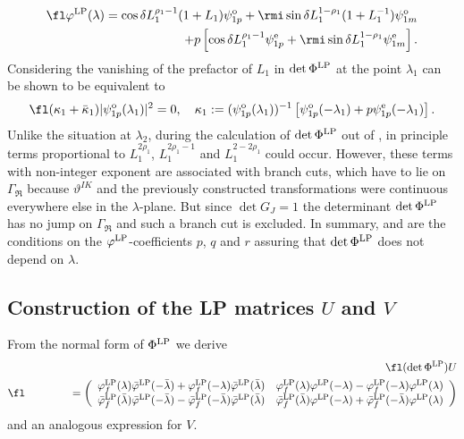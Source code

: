 \documentclass[12pt]{iopart}
\begin{document}
\begin{eqnarray}
\fl \varphi^{\rm LP}(\lambda)=\cos{\delta}L_1^{\rho_1-1}(1+L_1)\psi_{1p}^{\rm o} 
 +\rmi \sin{\delta}L_1^{1-\rho_1}(1+L_1^{-1})\psi_{1m}^{\rm o}\nonumber\\
+p\left[\cos{\delta}L_1^{\rho_1-1}\psi_{1p}^{\rm e}
 +\rmi\sin{\delta}L_1^{1-\rho_1}\psi_{1m}^{\rm e}\right].
 \label{chipsi1}
\end{eqnarray}
Considering  the vanishing of the prefactor of $L_1$ in $\det\Phi^{\rm LP}$ at the point $\lambda_1$ can be shown to be equivalent to
\begin{equation} \label{kappa1}
\fl(\kappa_1+\bar{\kappa}_1)|\psi_{1p}^{\rm o}(\lambda_1)|^2=0, \quad \kappa_1:=(\psi_{1p}^{\rm o}(\lambda_1))^{-1} \left[\psi_{1p}^{\rm o}(-\lambda_1)+p\psi_{1p}^{\rm e}(-\lambda_1)\right].
\end{equation}
Unlike the situation at $\lambda_2$, during the calculation of $\det\Phi^{\rm LP}$ out of , in principle terms proportional to $L_1^{2\rho_1}$, $L_1^{2\rho_1-1}$ and $L_1^{2-2\rho_1}$ could occur. However, these terms with non-integer exponent are  associated with branch cuts, which have to lie on $\Gamma_\Re$ because $\vartheta^{IK}$ and the previously constructed transformations were continuous everywhere else in the $\lambda$-plane. But since $\det G_J=1$ the  determinant $\det\Phi^{\rm LP}$ has no jump on $\Gamma_\Re$ and such a branch cut is excluded. In summary,  and  are the conditions on the $\varphi^{\rm LP}$-coefficients $p$, $q$ and $r$ assuring that $\det\Phi^{\rm LP}$ does not depend on $\lambda$.



\subsection{Construction of the LP matrices $U$ and $V$}

From the normal form of $\Phi^{\rm LP}$ we derive
\begin{eqnarray}
\fl (\det\Phi^{\rm LP}) U  \label{DchiU}\\
\fl \qquad\qquad=\left(\begin{array}{cc}
\varphi^{\rm LP}_f(\lambda)\bar{\varphi}^{\rm LP}(-\bar{\lambda})+\varphi^{\rm LP}_f(-\lambda)\bar{\varphi}^{\rm LP}(\bar{\lambda}) & \varphi^{\rm LP}_f(\lambda)\varphi^{\rm LP}(-\lambda)-\varphi^{\rm LP}_f(-\lambda)\varphi^{\rm LP}(\lambda) \\
\bar{\varphi}^{\rm LP}_f(\bar{\lambda})\bar{\varphi}^{\rm LP}(-\bar{\lambda})-\bar{\varphi}^{\rm LP}_f(-\bar{\lambda})\bar{\varphi}^{\rm LP}(\bar{\lambda}) &
\bar{\varphi}^{\rm LP}_f(\bar{\lambda})\varphi^{\rm LP}(-\lambda)+\bar{\varphi}^{\rm LP}_f(-\bar{\lambda})\varphi^{\rm LP}(\lambda)
\end{array}\right) \nonumber
\end{eqnarray}
and an analogous expression for $V$.
\end{document}
